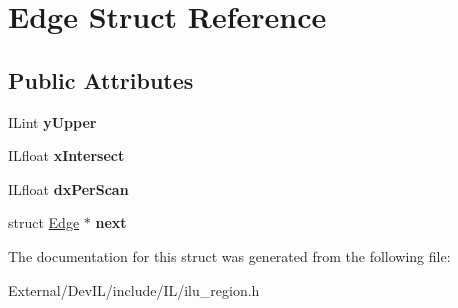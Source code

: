 \hypertarget{structEdge}{
\section{Edge Struct Reference}
\label{structEdge}
}
\subsection*{Public Attributes}
\begin{DoxyCompactItemize}
\item 
\hypertarget{structEdge_a1a16dc4d2ff0f05a9e6eabc7312be54b}{
ILint {\bfseries yUpper}}
\label{structEdge_a1a16dc4d2ff0f05a9e6eabc7312be54b}

\item 
\hypertarget{structEdge_a582f1338a0dceb913bdafa9be91da96f}{
ILfloat {\bfseries xIntersect}}
\label{structEdge_a582f1338a0dceb913bdafa9be91da96f}

\item 
\hypertarget{structEdge_ac68297f57351e80c50311788dfc7ebb7}{
ILfloat {\bfseries dxPerScan}}
\label{structEdge_ac68297f57351e80c50311788dfc7ebb7}

\item 
\hypertarget{structEdge_a6364279547b42e7fa3e418f44ec29f18}{
struct \hyperlink{structEdge}{Edge} $\ast$ {\bfseries next}}
\label{structEdge_a6364279547b42e7fa3e418f44ec29f18}

\end{DoxyCompactItemize}


The documentation for this struct was generated from the following file:\begin{DoxyCompactItemize}
\item 
External/DevIL/include/IL/ilu\_\-region.h\end{DoxyCompactItemize}
